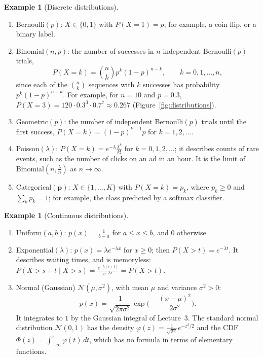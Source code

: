 \documentclass[11pt]{article}
\theoremstyle{definition}
\newtheorem{example}[definition]{Example}
\theoremstyle{plain}
\theoremstyle{remark}
\begin{document}
\begin{example}[Discrete distributions]\label{ex:discrete}
    \begin{enumerate}
        \item Bernoulli$(p)$: $X \in \{0, 1\}$ with $P(X = 1) = p$; for example, a coin flip, or a binary label.
        \item Binomial$(n, p)$: the number of successes in $n$ independent Bernoulli$(p)$ trials,
        \[P(X = k) = \binom{n}{k} p^k (1 - p)^{n-k}, \qquad k = 0, 1, \ldots, n,\]
        since each of the $\binom{n}{k}$ sequences with $k$ successes has probability $p^k(1 - p)^{n-k}$. For example, for $n = 10$ and $p = 0.3$, $P(X = 3) = 120 \cdot 0.3^3 \cdot 0.7^7 \approx 0.267$ (Figure~\ref{fig:distributions}).
        \item Geometric$(p)$: the number of independent Bernoulli$(p)$ trials until the first success, $P(X = k) = (1 - p)^{k-1}p$ for $k = 1, 2, \ldots$.
        \item Poisson$(\lambda)$: $P(X = k) = e^{-\lambda}\frac{\lambda^k}{k!}$ for $k = 0, 1, 2, \ldots$; it describes counts of rare events, such as the number of clicks on an ad in an hour. It is the limit of Binomial$(n, \frac{\lambda}{n})$ as $n \to \infty$.
        \item Categorical$(\mathbf{p})$: $X \in \{1, \ldots, K\}$ with $P(X = k) = p_k$, where $p_k \geq 0$ and $\sum_k p_k = 1$; for example, the class predicted by a softmax classifier.
    \end{enumerate}
\end{example}

\begin{example}[Continuous distributions]\label{ex:continuous}
    \begin{enumerate}
        \item Uniform$(a, b)$: $p(x) = \frac{1}{b - a}$ for $a \leq x \leq b$, and $0$ otherwise.
        \item Exponential$(\lambda)$: $p(x) = \lambda e^{-\lambda x}$ for $x \geq 0$; then $P(X > t) = e^{-\lambda t}$. It describes waiting times, and is memoryless: $P(X > s + t \mid X > s) = \frac{e^{-\lambda(s + t)}}{e^{-\lambda s}} = P(X > t)$.
        \item Normal (Gaussian) $\mathcal{N}(\mu, \sigma^2)$, with mean $\mu$ and variance $\sigma^2 > 0$:
        \[p(x) = \frac{1}{\sqrt{2\pi\sigma^2}} \exp\Big(-\frac{(x - \mu)^2}{2\sigma^2}\Big).\]
        It integrates to $1$ by the Gaussian integral of Lecture~3. The standard normal distribution $\mathcal{N}(0, 1)$ has the density $\varphi(z) = \frac{1}{\sqrt{2\pi}}e^{-z^2/2}$ and the CDF $\Phi(z) = \int_{-\infty}^z \varphi(t)\, dt$, which has no formula in terms of elementary functions.
    \end{enumerate}
\end{example}
\end{document}
